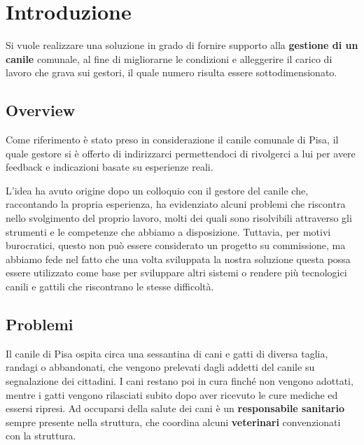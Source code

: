 

\chapter{Introduzione}
Si vuole realizzare una soluzione in grado di fornire supporto alla
\textbf{gestione di un canile} comunale, al fine di migliorarne le condizioni e alleggerire il carico di lavoro che grava sui gestori, il quale numero risulta essere sottodimensionato.

\section{Overview}
Come riferimento è stato preso in considerazione il  canile comunale di Pisa, il quale gestore si è offerto di indirizzarci permettendoci di rivolgerci a lui per avere feedback e indicazioni basate su esperienze reali.

L'idea ha avuto origine dopo un colloquio con il gestore del canile che, raccontando la propria esperienza, ha evidenziato alcuni problemi che riscontra nello svolgimento del proprio lavoro, molti dei quali sono risolvibili attraverso gli strumenti e le competenze che abbiamo a disposizione. Tuttavia, per motivi burocratici, questo non può essere considerato un progetto su commissione, ma abbiamo fede nel fatto che una volta sviluppata la nostra soluzione questa possa essere utilizzato come base per sviluppare altri sistemi o rendere più tecnologici canili e gattili che riscontrano le stesse difficoltà.

\section{Problemi}
Il canile di Pisa ospita circa una sessantina di cani e gatti di diversa taglia, randagi o abbandonati, che vengono prelevati dagli addetti del canile su segnalazione dei cittadini. I cani restano poi in cura finché non vengono adottati, mentre i gatti vengono rilasciati subito dopo aver ricevuto le cure  mediche ed essersi ripresi. Ad occuparsi della salute dei cani è un \textbf{responsabile sanitario} sempre presente nella struttura, che coordina alcuni \textbf{veterinari} convenzionati con la struttura.

